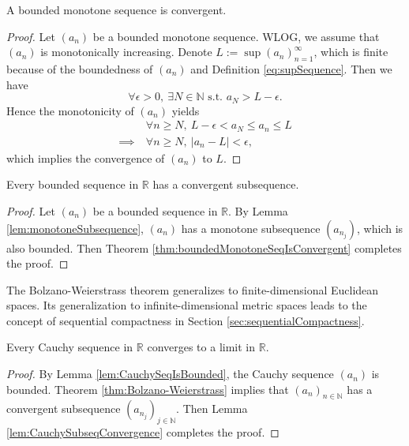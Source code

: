 \begin{thm}
  \label{thm:boundedMonotoneSeqIsConvergent}
  A bounded monotone sequence is convergent.
\end{thm}
\begin{proof}
  Let $(a_{n})$ be a bounded monotone sequence.
  WLOG, we assume that $(a_{n})$ is monotonically increasing.
  Denote $L:=\sup(a_{n})_{n=1}^{\infty}$, which is finite because of
  the boundedness of $(a_{n})$ and Definition \eqref{eq:supSequence}.
  Then we have
  \begin{displaymath}
    \forall \epsilon>0,\ \exists N\in \mathbb{N}
    \text{ s.t. } a_{N}>L-\epsilon.
  \end{displaymath}
  Hence the monotonicity of $(a_{n})$ yields
  \begin{align*}
    &\ \forall n\ge N,\
    L-\epsilon<a_{N}\le a_{n}\le L\\
    \implies &\ \forall n\ge N,\ |a_{n}-L|<\epsilon,
  \end{align*}
  which implies the convergence of $(a_{n})$ to $L$.
\end{proof}

\begin{thm}
  \label{thm:Bolzano-Weierstrass}
  Every bounded sequence in $\mathbb{R}$
  has a convergent subsequence.
\end{thm}
\begin{proof}
  Let $(a_{n})$ be a bounded sequence in $\mathbb{R}$.
  By Lemma \ref{lem:monotoneSubsequence},
  $(a_{n})$ has a monotone subsequence $(a_{n_{j}})$,
  which is also bounded.
  Then Theorem \ref{thm:boundedMonotoneSeqIsConvergent}
  completes the proof.
\end{proof}

\begin{rem}
  The Bolzano-Weierstrass theorem generalizes
  to finite-dimensional Euclidean spaces.
  Its generalization to infinite-dimensional metric spaces
  leads to the concept of sequential compactness
  in Section \ref{sec:sequentialCompactness}. 
\end{rem}

\begin{thm}%
  \label{thm:realCauchySeqConverges}
  Every Cauchy sequence in $\mathbb{R}$
  converges to a limit in $\mathbb{R}$.
\end{thm}
\begin{proof}
  By Lemma \ref{lem:CauchySeqIsBounded},
  the Cauchy sequence $(a_n)$ is bounded.
  Theorem \ref{thm:Bolzano-Weierstrass}
  implies that $(a_n)_{n\in \mathbb{N}}$ has a convergent
  subsequence $(a_{n_j})_{j\in \mathbb{N}}$.
  Then Lemma \ref{lem:CauchySubseqConvergence}
  completes the proof.
\end{proof}

